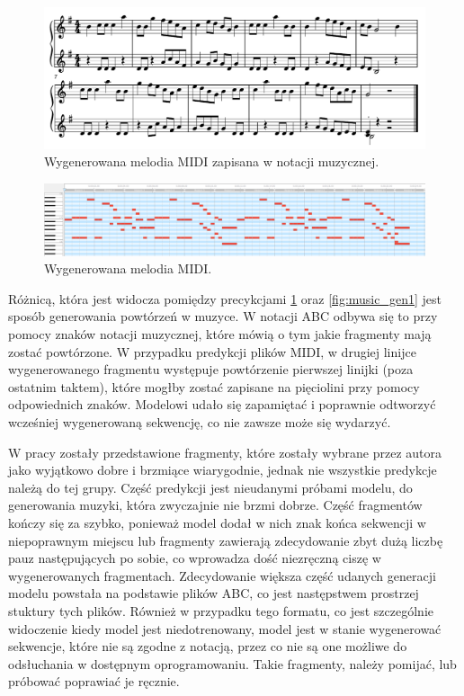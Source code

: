 \documentclass[data-science]{agh-wi} %
\begin{document}
\begin{figure}[ht!]
    \begin{center}
        \includegraphics[width=0.9\linewidth]{./img/35.pdf}
    \end{center}
    \caption{Wygenerowana melodia MIDI zapisana w notacji muzycznej.}\label{fig:music_genMIDI_notes}
\end{figure}

\begin{figure}[ht!]
    \begin{center}
        \includegraphics[width=0.9\linewidth]{./img/midi_generated.png}
    \end{center}
    \caption{Wygenerowana melodia MIDI.}\label{fig:music_genMIDI}
\end{figure}

Różnicą, która jest widocza pomiędzy precykcjami \ref*{fig:music_genMIDI_notes} oraz \ref*{fig:music_gen1} jest sposób generowania powtórzeń w muzyce. W notacji ABC odbywa się to przy pomocy znaków notacji muzycznej, które mówią o tym jakie fragmenty mają zostać powtórzone. W przypadku predykcji plików MIDI, w drugiej linijce wygenerowanego fragmentu występuje powtórzenie pierwszej linijki (poza ostatnim taktem), które mogłby zostać zapisane na pięciolini przy pomocy odpowiednich znaków. Modelowi udało się zapamiętać i poprawnie odtworzyć wcześniej wygenerowaną sekwencję, co nie zawsze może się wydarzyć.

W pracy zostały przedstawione fragmenty, które zostały wybrane przez autora jako wyjątkowo dobre i brzmiące wiarygodnie, jednak nie wszystkie predykcje należą do tej grupy. Część predykcji jest nieudanymi próbami modelu, do generowania muzyki, która zwyczajnie nie brzmi dobrze. Część fragmentów kończy się za szybko, ponieważ model dodał w nich znak końca sekwencji w niepoprawnym miejscu lub fragmenty zawierają zdecydowanie zbyt dużą liczbę pauz następujących po sobie, co wprowadza dość niezręczną ciszę w wygenerowanych fragmentach. Zdecydowanie większa część udanych generacji modelu powstała na podstawie plików ABC, co jest następstwem prostrzej stuktury tych plików. Również w przypadku tego formatu, co jest szczególnie widoczenie kiedy model jest niedotrenowany, model jest w stanie wygenerować sekwencje, które nie są zgodne z notacją, przez co nie są one możliwe do odsłuchania w dostępnym oprogramowaniu. Takie fragmenty, należy pomijać, lub próbować poprawiać je ręcznie.
\end{document}
